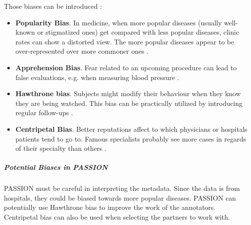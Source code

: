 \documentclass[12pt, a4paper, oneside]{book}   	%
\begin{document}
			Those biases can be introduced :
			\begin{itemize}
				\item \textbf{Popularity Bias}. In medicine, when more popular diseases (usually well-known or stigmatized ones) get compared with less popular diseases, clinic rates can show a distorted view. The more popular diseases appear to be over-represented over more commoner ones \autocite{Chakraborty_2024, c9, c6}.
				\item \textbf{Apprehension Bias}. Fear related to an upcoming procedure can lead to false evaluations, e.g. when measuring blood pressure \autocite{Chakraborty_2024, c13}.
				\item \textbf{Hawthrone bias}. Subjects might modify their behaviour when they know they are being watched. This bias can be practically utilized by introducing regular follow-ups \autocite{Chakraborty_2024, c8}.
				\item \textbf{Centripetal Bias}. Better reputations affect to which physicians or hospitals patients tend to go to. Famous specialists probably see more cases in regards of their specialty than others \autocite{Chakraborty_2024, c12}.
			\end{itemize}
			
			
			\subparagraph{Potential Biases in PASSION}
			PASSION must be careful in interpreting the metadata. Since the data is from hospitals, they could be biased towards more popular diseases.
			PASSION can potentially use Hawthrone bias to improve the work of the annotators.
			Centripetal bias can also be used when selecting the partners to work with.
			
\end{document}
